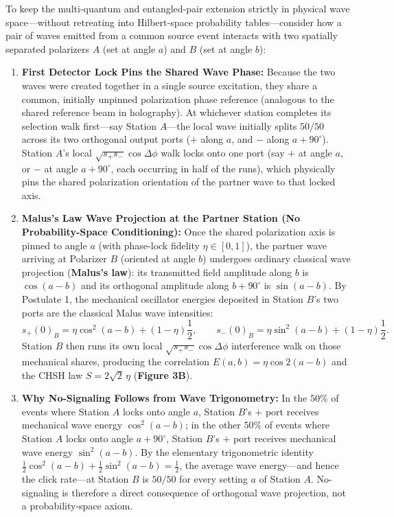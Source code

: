 \documentclass[11pt,a4paper]{article}
\begin{document}
To keep the multi-quantum and entangled-pair extension strictly in physical wave space---without retreating into Hilbert-space probability tables---consider how a pair of waves emitted from a common source event interacts with two spatially separated polarizers $A$ (set at angle $a$) and $B$ (set at angle $b$):
\begin{enumerate}[leftmargin=*]
    \item \textbf{First Detector Lock Pins the Shared Wave Phase:} Because the two waves were created together in a single source excitation, they share a common, initially unpinned polarization phase reference (analogous to the shared reference beam in holography). At whichever station completes its selection walk first---say Station $A$---the local wave initially splits $50/50$ across its two orthogonal output ports ($+$ along $a$, and $-$ along $a + 90^\circ$). Station $A$'s local $\sqrt{s_+ s_-}\cos\Delta\phi$ walk locks onto one port (say $+$ at angle $a$, or $-$ at angle $a + 90^\circ$, each occurring in half of the runs), which physically pins the shared polarization orientation of the partner wave to that locked axis.
    \item \textbf{Malus's Law Wave Projection at the Partner Station (No Probability-Space Conditioning):} Once the shared polarization axis is pinned to angle $a$ (with phase-lock fidelity $\eta \in [0, 1]$), the partner wave arriving at Polarizer $B$ (oriented at angle $b$) undergoes ordinary classical wave projection (\textbf{Malus's law}): its transmitted field amplitude along $b$ is $\cos(a - b)$ and its orthogonal amplitude along $b + 90^\circ$ is $\sin(a - b)$. By Postulate 1, the mechanical oscillator energies deposited in Station $B$'s two ports are the classical Malus wave intensities:
    \begin{equation}
        s_+(0)_B = \eta\cos^2(a - b) + (1 - \eta)\frac{1}{2}, \qquad s_-(0)_B = \eta\sin^2(a - b) + (1 - \eta)\frac{1}{2}.
    \end{equation}
    Station $B$ then runs its own local $\sqrt{s_+ s_-}\cos\Delta\phi$ interference walk on those mechanical shares, producing the correlation $E(a, b) = \eta\cos 2(a - b)$ and the CHSH law $S = 2\sqrt{2}\,\eta$ (\textbf{Figure 3B}).
    \item \textbf{Why No-Signaling Follows from Wave Trigonometry:} In the $50\%$ of events where Station $A$ locks onto angle $a$, Station $B$'s $+$ port receives mechanical wave energy $\cos^2(a - b)$; in the other $50\%$ of events where Station $A$ locks onto angle $a + 90^\circ$, Station $B$'s $+$ port receives mechanical wave energy $\sin^2(a - b)$. By the elementary trigonometric identity $\frac{1}{2}\cos^2(a - b) + \frac{1}{2}\sin^2(a - b) = \frac{1}{2}$, the average wave energy---and hence the click rate---at Station $B$ is $50/50$ for every setting $a$ of Station $A$. No-signaling is therefore a direct consequence of orthogonal wave projection, not a probability-space axiom.

\end{enumerate}
\end{document}

